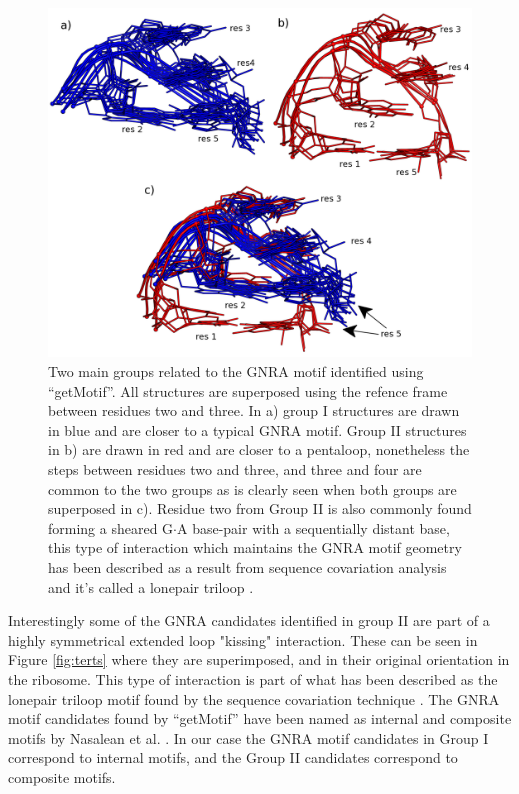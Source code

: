 \begin{figure}
\centering 
\includegraphics[angle=0, scale=2]{Chapter5/groupsB.png}
\caption{Two main  groups related to  the GNRA motif  identified using
  ``getMotif''. All structures are  superposed using the refence frame
  between residues two  and three. In a) group  I structures are drawn
  in blue and are closer to a typical GNRA motif.  Group II structures
  in b)  are drawn in red  and are closer to  a pentaloop, nonetheless
  the steps  between residues  two and three,  and three and  four are
  common to  the two groups  as is clearly  seen when both  groups are
  superposed in c).  Residue two  from Group II is also commonly found
  forming a  sheared G$\cdot$A  base-pair with a  sequentially distant
  base,  this  type of  interaction  which  maintains  the GNRA  motif
  geometry has  been described as  a result from  sequence covariation
  analysis and it's called a lonepair triloop \cite{lee2003}.}
\label{fig:groupsB}
\end{figure}

Interestingly some of  the GNRA candidates identified in  group II are
part    of   a    highly   symmetrical    extended    loop   "kissing"
interaction. These  can be seen  in Figure \ref{fig:terts}  where they
are  superimposed,   and  in  their  original   orientation  in  the
ribosome. This type of interaction  is part of what has been described
as  the  lonepair triloop  motif  found  by  the sequence  covariation
technique   \cite{lee2003}.  The  GNRA   motif  candidates   found  by
``getMotif'' have been named as internal and composite motifs by
Nasalean  et al.   \cite{nasalean2009}.  In our  case  the GNRA  motif
candidates in Group I correspond  to internal motifs, and the Group II
candidates correspond to composite motifs.

